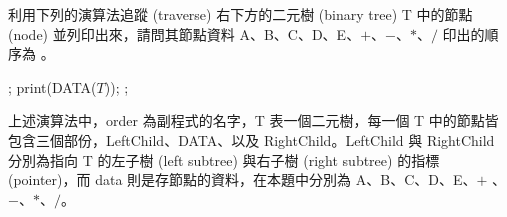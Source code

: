 \ifx\ntpcNinetyThree\undefined[93學年基北區] \fi
\label{ntpc-93-p42} 利用下列的演算法追蹤 (traverse) 右下方的二元樹 (binary tree) T 中的節點 (node) 並列印出來，請問其節點資料 A、B、C、D、E、$+$、$-$、$*$、$/$ 印出的順序為 \underlineblank{\ref{ntpc-93-p42}}。
\begin{figure}[h!]
  \begin{center}
  \end{center}
\end{figure}
\algrenewcommand{}
\algrenewcommand{}
\begin{algorithm}[h!]
  \begin{algorithmic}
      \State {};
      \State print(DATA($T$));
      \State {};
    \EndIf
  \EndProcedure
  \end{algorithmic}
\end{algorithm}
上述演算法中，order 為副程式的名字，T 表一個二元樹，每一個 T 中的節點皆包含三個部份，LeftChild、DATA、以及 RightChild。LeftChild 與 RightChild 分別為指向 T 的左子樹 (left subtree) 與右子樹 (right subtree) 的指標 (pointer)，而 data 則是存節點的資料，在本題中分別為 A、B、C、D、E、$+$ 、$-$、$*$、$/$。